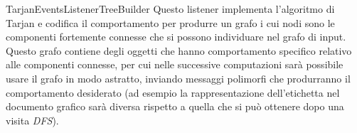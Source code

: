 \begin{paragraph}{TarjanEventsListenerTreeBuilder}
  Questo listener implementa l'algoritmo di Tarjan e codifica il
  comportamento per produrre un grafo i cui nodi sono le componenti
  fortemente connesse che si possono individuare nel grafo di
  input. Questo grafo contiene degli oggetti che hanno comportamento
  specifico relativo alle componenti connesse, per cui nelle
  successive computazioni sar\`a possibile usare il grafo in modo
  astratto, inviando messaggi polimorfi che produrranno il
  comportamento desiderato (ad esempio la rappresentazione
  dell'etichetta nel documento grafico sar\`a diversa rispetto a
  quella che si pu\`o ottenere dopo una visita \emph{DFS}).
\end{paragraph}



